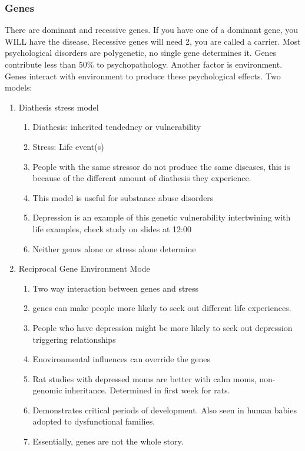 \documentclass[12pt]{article}
\begin{document}
\subsubsection{Genes}
There are dominant and recessive genes. If you have one of a dominant
gene, you WILL have the disease. Recessive genes will need 2, you are
called a carrier. Most psychological disorders are polygenetic, no
single gene determines it. Genes contribute less than 50\% to
psychopathology. Another factor is environment. Genes interact with
environment to produce these psychological effects. Two models:
\begin{enumerate}
\item Diathesis stress model
  \begin{enumerate}
  \item Diathesis: inherited tendedncy or vulnerability
  \item Stress: Life event(s)
  \item People with the same stressor do not produce the same
    diseases, this is because of the different amount of diathesis
    they experience.
  \item This model is useful for substance abuse disorders
  \item Depression is an example of this genetic vulnerability
    intertwining with life examples, check study on slides at 12:00
  \item Neither genes alone or stress alone determine
  \end{enumerate}
\item Reciprocal Gene Environment Mode
  \begin{enumerate}
  \item Two way interaction between genes and stress
  \item genes can make people more likely to seek out different life
    experiences.
  \item People who have depression might be more likely to seek out
    depression triggering relationships
  \item Enovironmental influences can override the genes
  \item Rat studies with depressed moms are better with calm moms,
    non-genomic inheritance. Determined in first week for rats.
  \item Demonstrates critical periods of development. Also seen in
    human babies adopted to dysfunctional families. 
  \item Essentially, genes are not the whole story. 
  \end{enumerate}
\end{enumerate}
\end{document}
